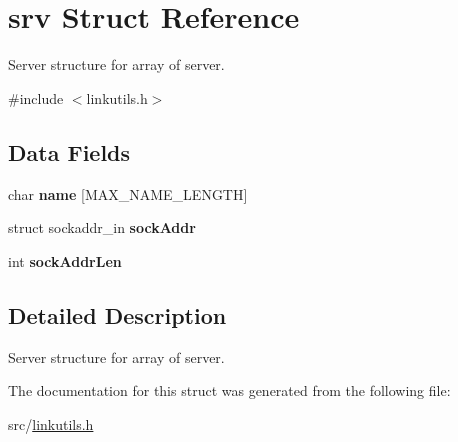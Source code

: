 \hypertarget{structsrv}{}\section{srv Struct Reference}
\label{structsrv}


Server structure for array of server.  




{\ttfamily \#include $<$linkutils.\+h$>$}

\subsection*{Data Fields}
\begin{DoxyCompactItemize}
\item 
\hypertarget{structsrv_abc8848a5afa0aa834354a5339844bca9}{}\label{structsrv_abc8848a5afa0aa834354a5339844bca9} 
char {\bfseries name} \mbox{[}M\+A\+X\+\_\+\+N\+A\+M\+E\+\_\+\+L\+E\+N\+G\+TH\mbox{]}
\item 
\hypertarget{structsrv_a308df6c40d30f76991ce58cbf7ae7db5}{}\label{structsrv_a308df6c40d30f76991ce58cbf7ae7db5} 
struct sockaddr\+\_\+in {\bfseries sock\+Addr}
\item 
\hypertarget{structsrv_a476e7f80dff36ca5d6f625e6aa1af243}{}\label{structsrv_a476e7f80dff36ca5d6f625e6aa1af243} 
int {\bfseries sock\+Addr\+Len}
\end{DoxyCompactItemize}


\subsection{Detailed Description}
Server structure for array of server. 

The documentation for this struct was generated from the following file\+:\begin{DoxyCompactItemize}
\item 
src/\hyperlink{linkutils_8h}{linkutils.\+h}\end{DoxyCompactItemize}
